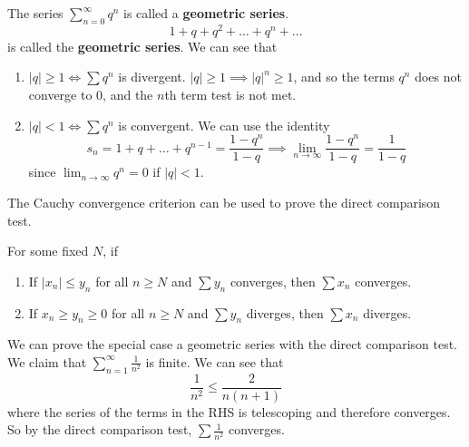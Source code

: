   \begin{example}
    The series $\sum_{n=0}^\infty q^n$ is called a \textbf{geometric series}. 
    \begin{equation}
      1 + q + q^2 + \ldots + q^n + \ldots
    \end{equation}
    is called the \textbf{geometric series}. We can see that 
    \begin{enumerate}
      \item $|q| \geq 1 \iff \sum q^n$ is divergent. $|q| \geq 1 \implies |q|^n \geq 1$, and so the terms $q^n$ does not converge to $0$, and the $n$th term test is not met. 
      \item $|q| < 1 \iff \sum q^n$ is convergent. We can use the identity 
      \begin{equation}
        s_n = 1 + q + \ldots + q^{n-1} = \frac{1 - q^n}{1-q} \implies \lim_{n \rightarrow \infty} \frac{1 - q^n}{1 - q} = \frac{1}{1 - q}
      \end{equation} 
      since $\lim_{n\rightarrow \infty} q^n = 0$ if $|q|<1$. 
    \end{enumerate}
  \end{example}

  The Cauchy convergence criterion can be used to prove the direct comparison test. 

  \begin{theorem} 
    For some fixed $N$, if 
    \begin{enumerate}
      \item If $|x_n| \leq y_n$ for all $n \geq N$ and $\sum y_n$ converges, then $\sum x_n$ converges. 
      \item If $x_n \geq y_n \geq 0$ for all $n \geq N$  and $\sum y_n$ diverges, then $\sum x_n$ diverges. 
    \end{enumerate}
  \end{theorem} 

  \begin{example}
    We can prove the special case a geometric series with the direct comparison test. We claim that $\sum_{n=1}^\infty \frac{1}{n^2}$ is finite. We can see that 
    \begin{equation}
      \frac{1}{n^2} \leq \frac{2}{n (n+1)} 
    \end{equation}
    where the series of the terms in the RHS is telescoping and therefore converges. So by the direct comparison test, $\sum \frac{1}{n^2}$ converges. 
  \end{example}

